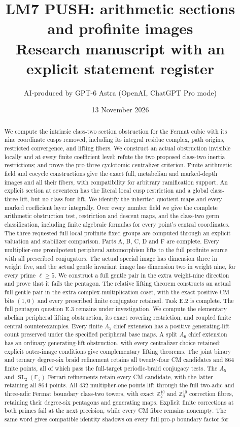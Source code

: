 \documentclass[11pt,a4paper]{article}
\title{LM7 PUSH: arithmetic sections and profinite images\\\large Research manuscript with an explicit statement register}
\author{AI-produced by GPT-6 Astra (OpenAI, ChatGPT Pro mode)}
\date{13 November 2026}
\newcommand{\F}{\mathbb F}
\begin{document}
\maketitle
\begin{abstract}
We compute the intrinsic class-two section obstruction for the Fermat cubic with its nine coordinate cusps removed, including its integral residue complex, path origins, restricted convergence, and lifting fibers. We construct an actual obstruction invisible locally and at every finite coefficient level; refute the two proposed class-two inertia restrictions; and prove the pro-three cyclotomic centralizer criterion. Finite arithmetic field and cocycle constructions give the exact full, metabelian and marked-depth images and all their fibers, with compatibility for arbitrary ramification support. An explicit section at seventeen has the literal local cusp restriction and a global class-three lift, but no class-four lift. We identify the inherited quotient maps and every marked coefficient layer integrally. Over every number field we give the complete arithmetic obstruction test, restriction and descent maps, and the class-two germ classification, including finite algebraic formulas for every point's central coordinates. The three requested full local profinite fixed groups are computed through an explicit valuation and stabilizer comparison. Parts A, B, C, D and F are complete. Every multiplier-one pronilpotent peripheral automorphism lifts to the full profinite source with all prescribed conjugators. The actual special image has dimension three in weight five, and the actual gentle invariant image has dimension two in weight nine, for every prime $\ell\ge5$. We construct a full gentle pair in the extra weight-nine direction and prove that it fails the pentagon. The relative lifting theorem constructs an actual full gentle pair in the extra complex-multiplication coset, with the exact positive CM bits $(1,0)$ and every prescribed finite conjugator retained. Task E.2 is complete. The full pentagon question E.3 remains under investigation. We compute the elementary abelian peripheral lifting obstruction, its exact covering restriction, and coupled finite central counterexamples. Every finite $A_5$ chief extension has a positive generating-lift count preserved under the specified peripheral base maps. A split $A_6$ chief extension has an ordinary generating-lift obstruction, with every centralizer choice retained; explicit outer-image conditions give complementary lifting theorems. The joint binary and ternary degree-six braid refinement retains all twenty-four CM candidates and $864$ finite points, all of which pass the full-target periodic-braid conjugacy tests. The $A_5$ and $\operatorname{SL}_2(\F_5)$ Ferrari refinements retain every CM candidate, with the latter retaining all $864$ points. All $432$ multiplier-one points lift through the full two-adic and three-adic Fermat boundary class-two towers, with exact $\mathbb Z_2^{10}$ and $\mathbb Z_3^{10}$ correction fibres, retaining their degree-six pentagons and generating maps. Explicit finite corrections at both primes fail at the next precision, while every CM fibre remains nonempty. The same word gives compatible identity shadows on every full pro-$p$ boundary factor for 
\end{abstract}
\end{document}
